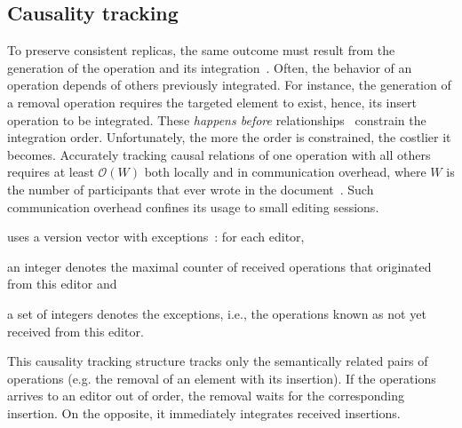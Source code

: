 

\subsection{Causality tracking}
\label{subsec:causality}

To preserve consistent replicas, the same outcome must result from the
generation of the operation and its integration~\cite{sun1998achieving}. Often,
the behavior of an operation depends of others previously integrated. For
instance, the generation of a removal operation requires the targeted element to
exist, hence, its insert operation to be integrated. These \emph{happens before}
relationships~\cite{lamport1978time} constrain the integration order.
Unfortunately, the more the order is constrained, the costlier it
becomes. Accurately tracking causal relations of one operation with all others
requires at least $\mathcal{O}(W)$ both locally and in communication overhead,
where $W$ is the number of participants that ever wrote in the
document~\cite{charronbost1991concerning}. Such communication overhead confines
its usage to small editing sessions.

\CRATE uses a version vector with
exceptions~\cite{malkhi2007concise, mukund2014optimized}: for each editor,
\begin{inparaenum}[(i)]
\item an integer denotes the maximal counter of received operations that
  originated from this editor and
\item a set of integers denotes the exceptions, i.e., the operations known as
  not yet received from this editor.
\end{inparaenum}
This causality tracking structure tracks only the semantically related pairs of
operations (e.g. the removal of an element with its insertion). If the
operations arrives to an editor out of order, the removal waits for the
corresponding insertion. On the opposite, it immediately integrates received
insertions.




%   

